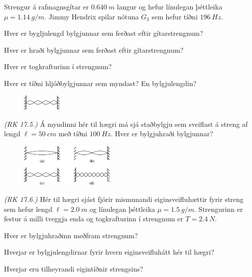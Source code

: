 \begin{enumerate}[label = \textbf{Dæmi \thechapter.\arabic*.}]
\setcounter{enumi}{28}

\item Strengur á rafmagnsgítar er $\SI{0.640}{m}$ langur og hefur línulegan þéttleika $\mu = \SI{1.14}{g/m}$. Jimmy Hendrix spilar nótuna $G_3$ sem hefur tíðni $\SI{196}{Hz}$. \begin{enumerate*}[label = \textbf{(\alph*)}]
    \item Hver er bygljulengd bylgjunnar sem ferðast eftir gítarstrengnum?
    \item Hver er hraði bylgjunnar sem ferðast eftir gítarstrengnum?
    \item Hver er togkrafturinn í strengnum?
    \item Hver er tíðni hljóðbylgjunnar sem myndast? En bylgjulengdin?
\end{enumerate*}

\begin{minipage}{\linewidth}

\begin{figure}
\vspace{-0.75cm}
\includegraphics[width = 0.75in]{figures/stadbylgjanmin.pdf}
\end{figure}

\item \textit{(RK 17.5.)} Á myndinni hér til hægri má sjá staðbylgju sem sveiflast á streng af lengd $\ell = \SI{50}{cm}$ með tíðni $\SI{100}{Hz}$. Hver er bylgjuhraði bylgjunnar?

\end{minipage}


\begin{minipage}{\linewidth}

\begin{figure}
\vspace{-0.5cm}
\includegraphics[width = 1.8in]{figures/standbert.pdf}
\end{figure}

\item \textit{(RK 17.6.)} Hér til hægri sjást fjórir mismunandi eiginsveifluhættir fyrir streng sem hefur lengd $\ell = \SI{2.0}{m}$ og línulegan þéttleika $\mu = \SI{1.5}{g/m}$. Strengurinn er festur á milli tveggja enda og togkrafturinn í strengnum er $T = \SI{2.4}{N}$. \begin{enumerate*}[label = \textbf{(\alph*)}]
    \item Hver er bylgjuhraðinn meðfram strengnum?
    \item Hverjar er bylgjulengdirnar fyrir hvern eiginsveifluhátt hér til hægri?
    \item Hverjar eru tilheyrandi eigintíðnir strengsins?
\end{enumerate*}


\end{minipage}
\end{enumerate}
